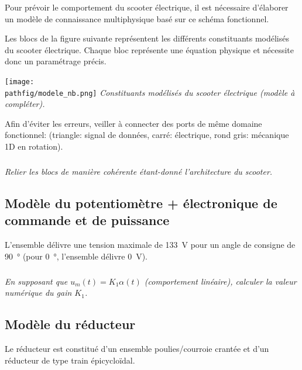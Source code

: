 \documentclass[10pt,fleqn]{article} %
\begin{document}
\begin{multicols}{2}
Pour prévoir le comportement du scooter électrique, il est nécessaire d'élaborer un modèle de connaissance multiphysique basé sur ce schéma fonctionnel. 

Les blocs de la figure suivante représentent les différents constituants modélisés du scooter électrique. Chaque bloc représente une équation physique et nécessite donc un paramétrage précis.


\begin{center}
\texttt{[image: \\pathfig/modele\_nb.png]}
\textit{Constituants modélisés du scooter électrique (modèle à compléter).}
\end{center}

\begin{methode}
Afin d'éviter les erreurs, veiller à connecter des ports de même domaine fonctionnel: (triangle: signal de données, carré: électrique, rond gris: mécanique 1D en rotation).
\end{methode}




\subparagraph{}\textit{Relier les blocs de manière cohérente étant-donné l'architecture du scooter.}



\subsection*{Modèle du potentiomètre + électronique de commande et de puissance}

L'ensemble délivre une tension maximale de \SI{133}{V} pour un angle de consigne de \SI{90}{\degree} (pour \SI{0}{\degree}, l'ensemble délivre \SI{0}{V}). 


\subparagraph{}\textit{En supposant que $u_m(t)=K_1\alpha(t)$ (comportement linéaire), calculer la valeur numérique du gain $K_1$.}



\subsection*{Modèle du réducteur}
Le réducteur est constitué d'un ensemble poulies/courroie crantée et d'un réducteur de type train épicycloïdal.%


\end{multicols}
\end{document}
